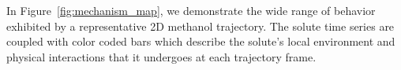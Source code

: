 \documentclass[journal=jpcbfk,manuscript=article]{achemso}
\begin{document}
  In Figure~\ref{fig:mechanism_map}, we demonstrate the wide range of behavior exhibited
  by a representative 2D methanol trajectory.
  The solute time series are coupled with color coded bars which describe the solute's
  local environment and physical interactions that it undergoes at each trajectory frame. 
\end{document}
